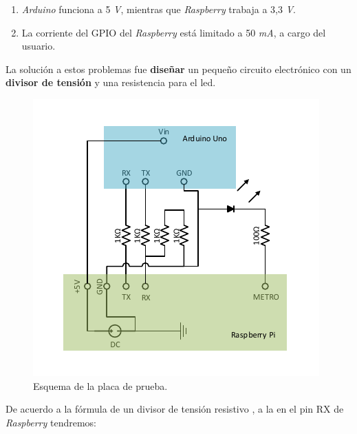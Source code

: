 \begin{enumerate}
	\item \textit{Arduino} funciona a 5 \textit{V}, mientras que \textit{Raspberry} trabaja a 3,3 \textit{V}.
	\item La corriente del \acrshort{GPIO} del \textit{Raspberry} está limitado a 50 \textit{mA}, a cargo del usuario.
\end{enumerate}

La solución a estos problemas fue \textbf{diseñar} un pequeño circuito electrónico con un \textbf{divisor de tensión} y una resistencia para el \acrshort{led}.

\smallskip

\begin{figure}[H]
	\noindent \begin{centering}
		\includegraphics[width=\linewidth/2]{capitulo6/proto_esquema}
		\par\end{centering}
	\smallskip
	\caption{\label{fig:proto_esquema} Esquema de la placa de prueba.}
\end{figure} 

\smallskip

De acuerdo a la fórmula de un divisor de tensión resistivo \cite{wiki_divtension}, a la en el pin RX de \textit{Raspberry} tendremos:

\smallskip

